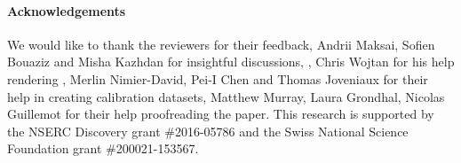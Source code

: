 \paragraph{Acknowledgements}
\begin{draft}
We would like to thank the reviewers for their feedback, Andrii Maksai, Sofien Bouaziz and Misha Kazhdan for insightful discussions, , Chris Wojtan for his help rendering , Merlin Nimier-David, Pei-I Chen and Thomas Joveniaux for their help in creating calibration datasets, Matthew Murray, Laura Grondhal, Nicolas Guillemot for their help proofreading the paper. 
% 
This research is supported by the NSERC Discovery grant \#2016-05786 and the Swiss National Science Foundation grant \#200021-153567.
\end{draft}